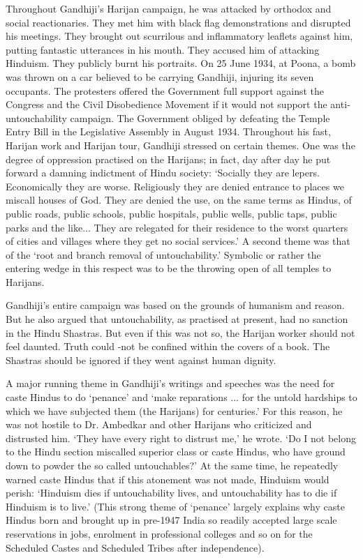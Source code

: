 Throughout Gandhiji's Harijan campaign, he was attacked by orthodox and social reactionaries. They met him with black flag demonstrations and disrupted his meetings. They brought out scurrilous and inflammatory leaflets against him, putting fantastic utterances in his mouth. They accused him of attacking Hinduism. They publicly burnt his portraits. On 25 June 1934, at Poona, a bomb was thrown on a car believed to be carrying Gandhiji, injuring its seven occupants. The protesters offered the Government full support against the Congress and the Civil Disobedience Movement if it would not support the anti­ untouchability campaign. The Government obliged by defeating the Temple Entry Bill in the Legislative Assembly in August 1934. Throughout his fast, Harijan work and Harijan tour, Gandhiji stressed on certain themes. One was the degree of oppression practised on the Harijans; in fact, day after day he put forward a damning indictment of Hindu society: `Socially they are lepers. Economically they are worse. Religiously they are denied entrance to places we miscall houses of God. They are denied the use, on the same terms as Hindus, of public roads, public schools, public hospitals, public wells, public taps, public parks and the like... They are relegated for their residence to the worst quarters of cities and villages where they get no social services.' A second theme was that of the `root and branch removal of untouchability.' Symbolic or rather the entering wedge in this respect was to be the throwing open of all temples to Harijans. 

Gandhiji's entire campaign was based on the grounds of humanism and reason. But he also argued that untouchability, as practised at present, had no sanction in the Hindu Shastras. But even if this was not so, the Harijan worker should not feel daunted. Truth could -not be confined within the covers of a book. The Shastras should be ignored if they went against human dignity. 

A major running theme in Gandhiji's writings and speeches was the need for caste Hindus to do `penance' and `make reparations ... for the untold hardships to which we have subjected them (the Harijans) for centuries.' For this reason, he was not hostile to Dr. Ambedkar and other Harijans who criticized and distrusted him. `They have every right to distrust me,' he wrote. `Do I not belong to the Hindu section miscalled superior class or caste Hindus, who have ground down to powder the so called untouchables?' At the same time, he repeatedly warned caste Hindus that if this atonement was not made, Hinduism would perish: `Hinduism dies if untouchability lives, and untouchability has to die if Hinduism is to live.' (This strong theme of `penance' largely explains why caste Hindus born and brought up in pre-1947 India so readily accepted large scale reservations in jobs, enrolment in professional colleges and so on for the Scheduled Castes and Scheduled Tribes after independence). 

